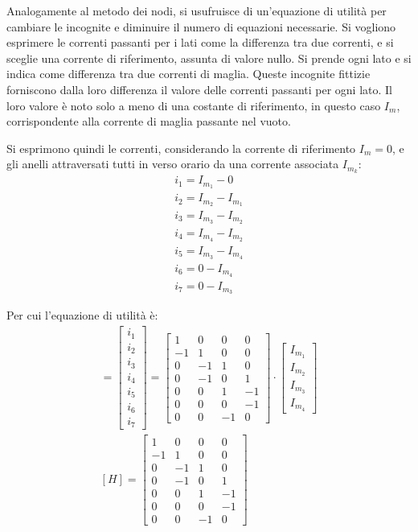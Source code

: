 \documentclass{article}
\numberwithin{equation}{subsection}
\begin{document}
Analogamente al metodo dei nodi, si usufruisce di un'equazione di utilità per cambiare le incognite e diminuire il numero di equazioni necessarie. Si vogliono esprimere 
le correnti passanti per i lati come la differenza tra due correnti, e si sceglie una corrente di riferimento, assunta di valore nullo. Si prende ogni lato e si indica come 
differenza tra due correnti di maglia. Queste incognite fittizie forniscono dalla loro differenza il valore delle correnti passanti per ogni lato. Il loro valore è noto 
solo a meno di una costante di riferimento, in questo caso $I_m$, corrispondente alla corrente di maglia passante nel vuoto. 

Si esprimono quindi le correnti, considerando la corrente di riferimento $I_m=0$, e gli anelli attraversati tutti in verso orario da una corrente associata $I_{m_k}$:
\begin{gather*}
    i_1=I_{m_1}-0\\
    i_2=I_{m_2}-I_{m_1}\\
    i_3=I_{m_3}-I_{m_2}\\
    i_4=I_{m_4}-I_{m_2}\\
    i_5=I_{m_3}-I_{m_4}\\
    i_6=0-I_{m_4}\\
    i_7=0-I_{m_3}
\end{gather*}

Per cui l'equazione di utilità è: 
\begin{gather*}
    [i_l]=\begin{bmatrix}
        i_1\\
        i_2\\
        i_3\\
        i_4\\
        i_5\\
        i_6\\
        i_7
    \end{bmatrix}=\begin{bmatrix}
        1&0&0&0\\
        -1&1&0&0\\
        0&-1&1&0\\
        0&-1&0&1\\
        0&0&1&-1\\
        0&0&0&-1\\
        0&0&-1&0
    \end{bmatrix}\cdot\begin{bmatrix}
        I_{m_1}\\
        I_{m_2}\\
        I_{m_3}\\
        I_{m_4}
    \end{bmatrix}\\
    [H]=\begin{bmatrix}
        1&0&0&0\\
        -1&1&0&0\\
        0&-1&1&0\\
        0&-1&0&1\\
        0&0&1&-1\\
        0&0&0&-1\\
        0&0&-1&0
    \end{bmatrix}
\end{gather*}
\end{document}
